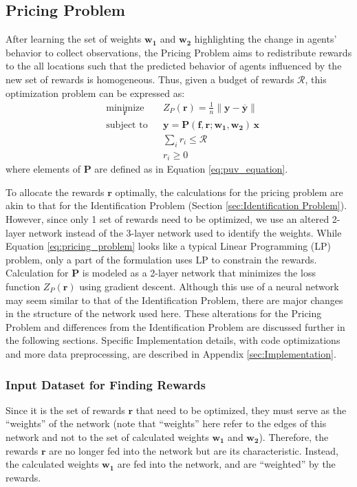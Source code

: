 \documentclass[12pt]{article}
\newcommand{\vect}[1]{\mathbf{#1}}  %
\newcommand{\matr}[1]{\mathbf{#1}}  %
\newcommand{\mean}[1]{\overline{#1}}    %
\begin{document}
    \subsection{Pricing Problem} \label{sec:Pricing Problem}
    After learning the set of weights $\matr{w_1}$ and $\matr{w_2}$ highlighting the change in agents' behavior to collect observations, the Pricing Problem aims to redistribute rewards to the all locations such that the predicted behavior of agents influenced by the new set of rewards is homogeneous. Thus, given a budget of rewards $\mathcal{R}$, this optimization problem can be expressed as:
    \begin{equation} \label{eq:pricing_problem}
        \begin{aligned}
            & \underset{\vect{r}}{\text{minimize}}
            & & Z_P(\vect{r}) = \frac{1}{n}\lVert \vect{y} - \mean{\vect{y}} \rVert\\
            & \text{subject to}
            & & \vect{y} = \matr{P}(\matr{f}, \vect{r}; \matr{w_1}, \matr{w_2}) \, \vect{x}\\
            &&& \sum_{i} r_i \leq \mathcal{R}\\
            &&& r_i \geq 0
        \end{aligned}
    \end{equation}
    where elements of $\matr{P}$ are defined as in Equation \ref{eq:puv_equation}.
    
    To allocate the rewards $\vect{r}$ optimally, the calculations for the pricing problem are akin to that for the Identification Problem (Section \ref{sec:Identification Problem}). However, since only 1 set of rewards need to be optimized, we use an altered 2-layer network instead of the 3-layer network used to identify the weights. While Equation \ref{eq:pricing_problem} looks like a typical Linear Programming (LP) problem, only a part of the formulation uses LP to constrain the rewards. Calculation for $\matr{P}$ is modeled as a 2-layer network that minimizes the loss function $Z_P(\vect{r})$ using gradient descent. Although this use of a neural network may seem similar to that of the Identification Problem, there are major changes in the structure of the network used here. These alterations for the Pricing Problem and differences from the Identification Problem are discussed further in the following sections. Specific Implementation details, with code optimizations and more data preprocessing, are described in Appendix \ref{sec:Implementation}.
    
    \subsubsection{Input Dataset for Finding Rewards}
    Since it is the set of rewards $\vect{r}$ that need to be optimized, they must serve as the ``weights'' of the network (note that ``weights'' here refer to the edges of this network and not to the set of calculated weights $\matr{w_1}$ and $\matr{w_2}$). Therefore, the rewards $\vect{r}$ are no longer fed into the network but are its characteristic. Instead, the calculated weights $\matr{w_1}$ are fed into the network, and are ``weighted'' by the rewards.
    
\end{document}
